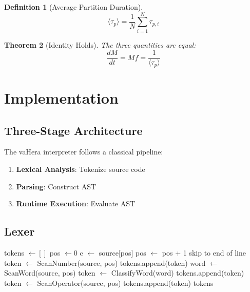 \documentclass[twocolumn,10pt]{article}
\newtheorem{theorem}{Theorem}[section]
\theoremstyle{definition}
\newtheorem{definition}[theorem]{Definition}
\theoremstyle{remark}
\begin{document}
\begin{definition}[Average Partition Duration]
\begin{equation}
    \langle\tau_p\rangle = \frac{1}{N} \sum_{i=1}^{N} \tau_{p,i}
\end{equation}
\end{definition}

\begin{theorem}[Identity Holds]
The three quantities are equal:
\begin{equation}
    \frac{dM}{dt} = Mf = \frac{1}{\langle\tau_p\rangle}
\end{equation}
\end{theorem}

\section{Implementation}
\label{sec:implementation}

\subsection{Three-Stage Architecture}

The vaHera interpreter follows a classical pipeline:

\begin{enumerate}
    \item \textbf{Lexical Analysis}: Tokenize source code
    \item \textbf{Parsing}: Construct AST
    \item \textbf{Runtime Execution}: Evaluate AST
\end{enumerate}

\subsection{Lexer}

\begin{algorithm}
\caption{vaHera Lexer}
\begin{algorithmic}[1]
    \State tokens $\gets []$
    \State pos $\gets 0$
        \State c $\gets$ source[pos]
            \State pos $\gets$ pos + 1
            \State skip to end of line
            \State token $\gets$ ScanNumber(source, pos)
            \State tokens.append(token)
            \State word $\gets$ ScanWord(source, pos)
            \State token $\gets$ ClassifyWord(word)
            \State tokens.append(token)
        \Else
            \State token $\gets$ ScanOperator(source, pos)
            \State tokens.append(token)
        \EndIf
    \EndWhile
    \State \Return tokens
\EndFunction
\end{algorithmic}
\end{algorithm}
\end{document}
